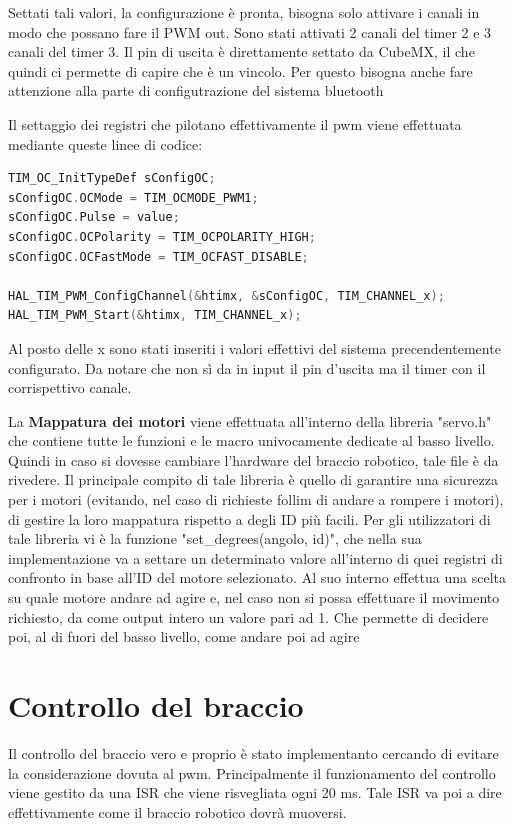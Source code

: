 Settati tali valori, la configurazione è pronta, bisogna solo attivare i canali in modo che possano fare il PWM out. Sono stati attivati 2 canali del timer 2 e 3 canali del timer 3. Il pin di uscita è direttamente settato da CubeMX, il che quindi ci permette di capire che è un vincolo. Per questo bisogna anche fare attenzione alla parte di configutrazione del sistema bluetooth

Il settaggio dei registri che pilotano effettivamente il pwm viene effettuata mediante queste linee di codice:

\begin{lstlisting}[language=C, title={Settaggio del resgistro CCR (Pulse) con STMCubeIDE e HAL}]
TIM_OC_InitTypeDef sConfigOC;
sConfigOC.OCMode = TIM_OCMODE_PWM1;
sConfigOC.Pulse = value;
sConfigOC.OCPolarity = TIM_OCPOLARITY_HIGH;
sConfigOC.OCFastMode = TIM_OCFAST_DISABLE;

HAL_TIM_PWM_ConfigChannel(&htimx, &sConfigOC, TIM_CHANNEL_x);
HAL_TIM_PWM_Start(&htimx, TIM_CHANNEL_x);
\end{lstlisting}

Al posto delle x sono stati inseriti i valori effettivi del sistema precendentemente configurato. Da notare che non sì da in input il pin d'uscita ma il timer con il corrispettivo canale. 

La \textbf{Mappatura dei motori} viene effettuata all'interno della libreria "servo.h" che contiene tutte le funzioni e le macro univocamente dedicate al basso livello. Quindi in caso si dovesse cambiare l'hardware del braccio robotico, tale file è da rivedere. Il principale compito di tale libreria è quello di garantire una sicurezza per i motori (evitando, nel caso di richieste follim di andare a rompere i motori), di gestire la loro mappatura rispetto a degli ID più facili. Per gli utilizzatori di tale libreria vi è la funzione "set\_degrees(angolo, id)", che nella sua implementazione va a settare un determinato valore all'interno di quei registri di confronto in base all'ID del motore selezionato. 
Al suo interno effettua una scelta su quale motore andare ad agire e, nel caso non si possa effettuare il movimento richiesto, da come output intero un valore pari ad 1. Che permette di decidere poi, al di fuori del basso livello, come andare poi ad agire

\section{Controllo del braccio}
Il controllo del braccio vero e proprio è stato implementanto cercando di evitare la considerazione dovuta al pwm. Principalmente il funzionamento del controllo viene gestito da una ISR che viene risvegliata ogni 20 ms. Tale ISR va poi a dire effettivamente come il braccio robotico dovrà muoversi.

